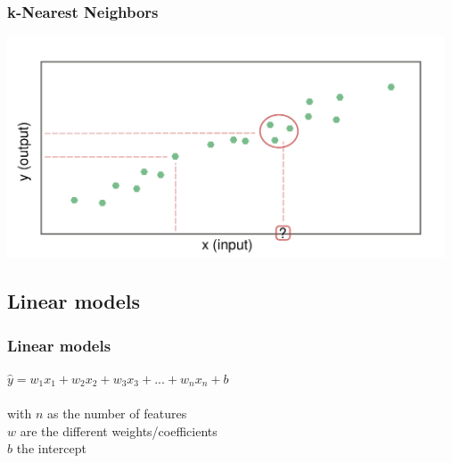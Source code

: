 \documentclass[aspectratio=169]{beamer}
\begin{document}
\begin{frame}
  \frametitle{k-Nearest Neighbors}
  \begin{center}
    \includegraphics[width=13.0cm]{images/k_nearest_neighbour_regression_k_3.pdf}
  \end{center}
\end{frame}


\subsection{Linear models}

\setcounter{tocdepth}{2}
\begin{frame}{}
   \tableofcontents[currentsubsection]
\end{frame}


\begin{frame}
  \frametitle{Linear models}
  \begin{block}{}
    \begin{center}
      $\hat{y} = w_{1}x_{1} + w_{2}x_{2} + w_{3}x_{3} + ... + w_{n}x_{n} + b$\\
      \ \\
      with $n$ as the  number of features\\
      $w$ are the different weights/coefficients\\
      $b$ the intercept\\
    \end{center}
  \end{block}  
\end{frame}
\end{document}
